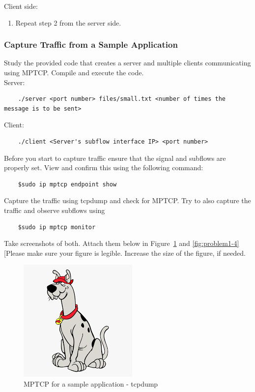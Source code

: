\documentclass[11pt]{article}
\begin{document}
\vspace{-15pt}
Client side:
\vspace{-10pt}
\begin{enumerate}
    \item Repeat step 2 from the server side. 
\end{enumerate}

\subsubsection{Capture Traffic from a Sample Application}

Study the provided code that creates a server and multiple clients communicating using MPTCP. Compile and execute the code.\\ 

Server:
\begin{verbatim}
    ./server <port number> files/small.txt <number of times the message is to be sent>
\end{verbatim}

Client:
\begin{verbatim}
    ./client <Server's subflow interface IP> <port number>
\end{verbatim}


Before you start to capture traffic ensure that the signal and subflows are properly set. View and confirm this using the following command:
\begin{verbatim}
    $sudo ip mptcp endpoint show
\end{verbatim}

Capture the traffic using tcpdump and check for MPTCP. Try to also capture the traffic and observe subflows using 
\begin{verbatim}
    $sudo ip mptcp monitor
\end{verbatim}

Take screenshots of both. Attach them below in Figure~\ref{fig:problem1-3} and \ref{fig:problem1-4} [Please make sure your figure is legible. Increase the size of the figure, if needed.

\begin{figure}[ht]
\centering
\includegraphics[width=.49\columnwidth]{dummy.png}
\hspace{10mm}
\caption{MPTCP for a sample application - tcpdump}
\label{fig:problem1-3}
\end{figure}
\end{document}

